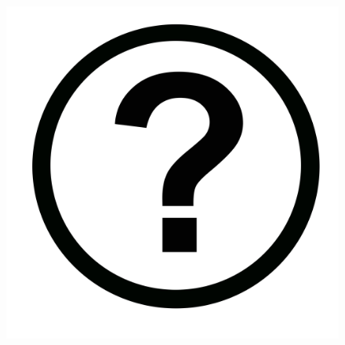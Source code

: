 \documentclass[compress,pdf,11pt,xcolor=dvipsnames]{beamer}
\begin{document}
% 
% 
\begin{frame}{}
  \begin{figure}
    \begin{centering}
      \includegraphics[scale=0.1]{img/Icon-round-Question_mark.jpg}
      \par\end{centering}
  \end{figure}
\end{frame}
\end{document}
